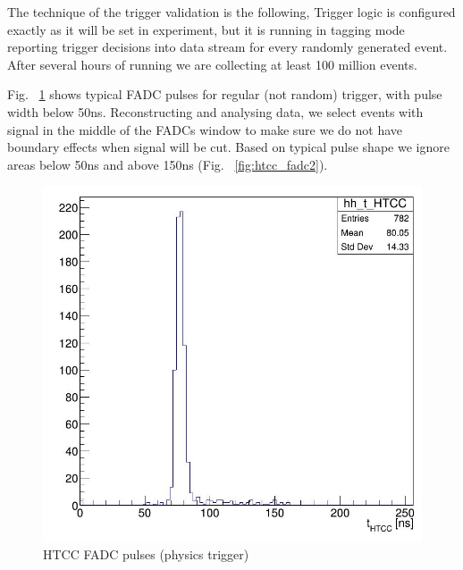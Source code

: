 The technique of the trigger validation is the following, Trigger logic is configured exactly as it will be set in experiment, but it is running in tagging mode reporting trigger decisions into data stream for every randomly generated event. After several hours of running we are collecting at least 100 million events.

Fig. ~\ref{fig:htcc_fadc1} shows typical FADC pulses for regular (not random) trigger, with pulse width below 50ns. Reconstructing and analysing data, we select events with signal in the middle of the FADCs window to make sure we do not have boundary effects when signal will be cut. Based on typical pulse shape we ignore areas below 50ns and above 150ns (Fig. ~\ref{fig:htcc_fadc2}).

\begin{figure}[hbt]
	\centering
	\includegraphics[width=1.0\columnwidth,keepaspectratio]{img/htcc_fadc1.png}
	\caption{HTCC FADC pulses (physics trigger)}
	\label{fig:htcc_fadc1}
\end{figure}

